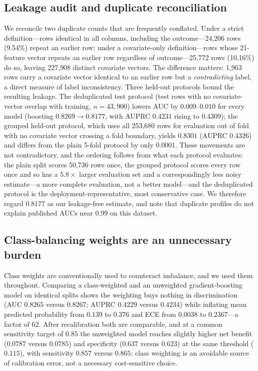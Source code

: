 \documentclass[conference]{IEEEtran}
\begin{document}
\subsection{Leakage audit and duplicate reconciliation}
We reconcile two duplicate counts that are frequently conflated. Under a strict definition---rows identical in all columns, including the outcome---24{,}206 rows (9.54\%) repeat an earlier row; under a covariate-only definition---rows whose 21-feature vector repeats an earlier row regardless of outcome---25{,}772 rows (10.16\%) do so, leaving 227{,}908 distinct covariate vectors. The difference matters: 1{,}963 rows carry a covariate vector identical to an earlier row but a \emph{contradicting} label, a direct measure of label inconsistency. Three held-out protocols bound the resulting leakage. The deduplicated test protocol (test rows with no covariate-vector overlap with training, $n = 43{,}900$) lowers AUC by $0.009$--$0.010$ for every model (boosting $0.8269 \rightarrow 0.8177$, with AUPRC $0.4231$ rising to $0.4309$); the grouped held-out protocol, which uses all 253{,}680 rows for evaluation out of fold with no covariate vector crossing a fold boundary, yields $0.8301$ (AUPRC $0.4326$) and differs from the plain 5-fold protocol by only $0.0001$. These movements are not contradictory, and the ordering follows from what each protocol evaluates: the plain split scores 50{,}736 rows once, the grouped protocol scores every row once and so has a $5.8\times$ larger evaluation set and a correspondingly less noisy estimate---a more complete evaluation, not a better model---and the deduplicated protocol is the deployment-representative, most conservative case. We therefore regard $0.8177$ as our leakage-free estimate, and note that duplicate profiles do not explain published AUCs near $0.99$ on this dataset.

\subsection{Class-balancing weights are an unnecessary burden}
Class weights are conventionally used to counteract imbalance, and we used them throughout. Comparing a class-weighted and an unweighted gradient-boosting model on identical splits shows the weighting buys nothing in discrimination (AUC $0.8265$ versus $0.8267$; AUPRC $0.4229$ versus $0.4234$) while inflating mean predicted probability from $0.139$ to $0.376$ and ECE from $0.0038$ to $0.2367$---a factor of $62$. After recalibration both are comparable, and at a common sensitivity target of $0.85$ the unweighted model reaches slightly higher net benefit ($0.0787$ versus $0.0785$) and specificity ($0.637$ versus $0.623$) at the same threshold ($0.115$), with sensitivity $0.857$ versus $0.865$: class weighting is an avoidable source of calibration error, not a necessary cost-sensitive choice.
\end{document}
